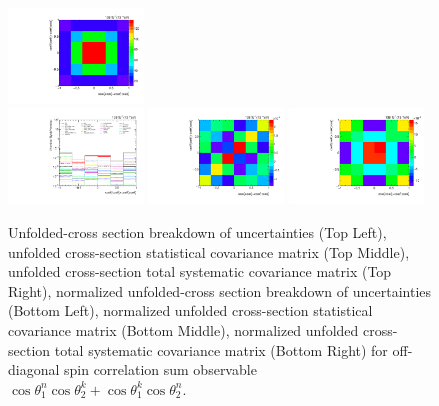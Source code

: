 \begin{refsection}
\begin{figure}[htb]
\begin{center}
 \includegraphics[width=0.32\textwidth]{fig_fullRun2UL/unfolding/combined/TotalSystCovMatrix_rebinnedB_c_Pnk.pdf} \\
 \includegraphics[width=0.32\textwidth]{fig_fullRun2UL/unfolding/combined/deltaSystCombinedlogNorm_rebinnedB_c_Pnk.pdf}
 \includegraphics[width=0.32\textwidth]{fig_fullRun2UL/unfolding/combined/StatCovMatrixNorm_rebinnedB_c_Pnk.pdf}
 \includegraphics[width=0.32\textwidth]{fig_fullRun2UL/unfolding/combined/TotalSystCovMatrixNorm_rebinnedB_c_Pnk.pdf} \\
\caption{Unfolded-cross section breakdown of uncertainties (Top Left), unfolded cross-section statistical covariance matrix (Top Middle), unfolded cross-section total systematic covariance matrix (Top Right), normalized unfolded-cross section breakdown of uncertainties (Bottom Left), normalized unfolded cross-section statistical covariance matrix (Bottom Middle), normalized unfolded cross-section total systematic covariance matrix (Bottom Right) for off-diagonal spin correlation sum observable $\cos\theta_{1}^{n}\cos\theta_{2}^{k}+\cos\theta_{1}^{k}\cos\theta_{2}^{n}$.}
\label{fig:c_Pnk_uncertainties}
\end{center}
\end{figure}

\end{refsection}
